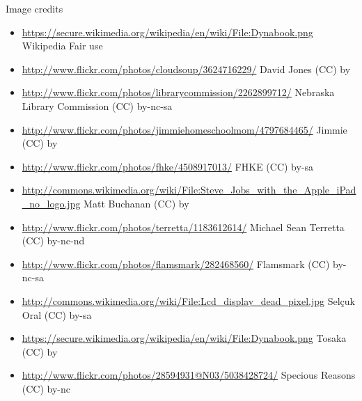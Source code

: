 \begin{frame}{Image credits}
  \tiny
  \begin{itemize}
    \item \url{https://secure.wikimedia.org/wikipedia/en/wiki/File:Dynabook.png} Wikipedia Fair use
    \item \url{http://www.flickr.com/photos/cloudsoup/3624716229/} David Jones (CC) by
    \item \url{http://www.flickr.com/photos/librarycommission/2262899712/} Nebraska Library Commission (CC) by-nc-sa
    \item \url{http://www.flickr.com/photos/jimmiehomeschoolmom/4797684465/} Jimmie (CC) by
    \item \url{http://www.flickr.com/photos/fhke/4508917013/} FHKE (CC) by-sa
    \item \url{http://commons.wikimedia.org/wiki/File:Steve_Jobs_with_the_Apple_iPad_no_logo.jpg} Matt Buchanan (CC) by
    \item \url{http://www.flickr.com/photos/terretta/1183612614/} Michael Sean Terretta (CC) by-nc-nd
    \item \url{http://www.flickr.com/photos/flamsmark/282468560/} Flamsmark (CC) by-nc-sa
    \item \url{http://commons.wikimedia.org/wiki/File:Lcd_display_dead_pixel.jpg} Selçuk Oral (CC) by-sa
    \item \url{https://secure.wikimedia.org/wikipedia/en/wiki/File:Dynabook.png} Tosaka (CC) by
    \item \url{http://www.flickr.com/photos/28594931@N03/5038428724/} Specious Reasons (CC) by-nc
  \end{itemize}
\end{frame}
